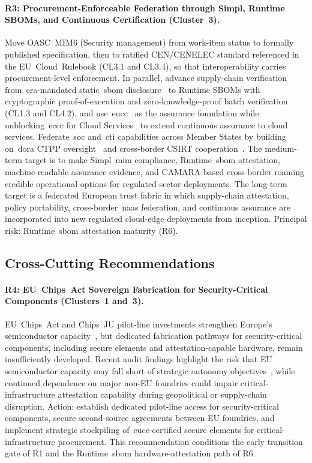 \documentclass{ieeeaccess}
\begin{document}
\paragraph{R3: Procurement-Enforceable Federation through Simpl, Runtime SBOMs, and Continuous Certification (Cluster~3).}
Move OASC~MIM6 (Security management) from work-item status to formally published specification, then to ratified CEN/CENELEC standard referenced in the EU~Cloud~Rulebook (CL3.1 and CL3.4), so that interoperability carries procurement-level enforcement. In parallel, advance supply-chain verification from~\gls{cra}-mandated static~\gls{sbom} disclosure~\cite{eucra2024} to Runtime SBOMs with cryptographic proof-of-execution and zero-knowledge-proof batch verification (CL1.3 and CL4.2), and use~\gls{eucc}~\cite{commreg2024eucc} as the assurance foundation while unblocking~\gls{eccc} for Cloud Services~\cite{eucsa} to extend continuous assurance to cloud services. Federate~\gls{soc} and~\gls{cti} capabilities across Member States by building on~\gls{dora} CTPP oversight~\cite{esa2025ctpp} and cross-border CSIRT cooperation~\cite{concordia2022}. The medium-term target is to make Simpl~\gls{mim} compliance, Runtime~\gls{sbom} attestation, machine-readable assurance evidence, and CAMARA-based cross-border roaming credible operational options for regulated-sector deployments. The long-term target is a federated European trust fabric in which supply-chain attestation, policy portability, cross-border~\gls{naas} federation, and continuous assurance are incorporated into new regulated cloud-edge deployments from inception. Principal risk: Runtime~\gls{sbom} attestation maturity (R6).

\subsection{Cross-Cutting Recommendations}
\label{sec:recs-crosscut}

\paragraph{R4: EU~Chips~Act Sovereign Fabrication for Security-Critical Components (Clusters~1 and~3).}
EU~Chips~Act and Chips~JU pilot-line investments strengthen Europe's semiconductor capacity~\cite{euchipsact}, but dedicated fabrication pathways for security-critical components, including secure elements and attestation-capable hardware, remain insufficiently developed. Recent audit findings highlight the risk that EU semiconductor capacity may fall short of strategic autonomy objectives~\cite{eurochipsaudit2025}, while continued dependence on major non-EU foundries could impair critical-infrastructure attestation capability during geopolitical or supply-chain disruption. Action: establish dedicated pilot-line access for security-critical components, secure second-source agreements between EU foundries, and implement strategic stockpiling of~\gls{eucc}-certified secure elements for critical-infrastructure procurement. This recommendation conditions the early transition gate of R1 and the Runtime~\gls{sbom} hardware-attestation path of R6.
\end{document}
